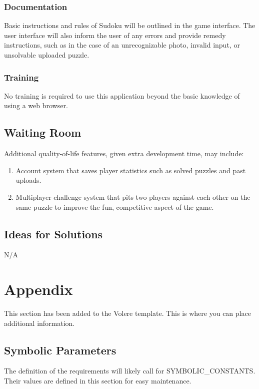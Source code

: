 \documentclass[11pt]{article}
\begin{document}
\subsubsection{Documentation}
Basic instructions and rules of Sudoku will be outlined in the game interface. The user interface will also inform the user of any errors and provide remedy instructions, such as in the case of an unrecognizable photo, invalid input, or unsolvable uploaded puzzle.

\subsubsection{Training}
No training is required to use this application beyond the basic knowledge of using a web browser.

\subsection{Waiting Room}
Additional quality-of-life features, given extra development time, may include:
\begin{enumerate}
    \item Account system that saves player statistics such as solved puzzles and past uploads.
    \item Multiplayer challenge system that pits two players against each other on the same puzzle to improve the fun, competitive aspect of the game.
\end{enumerate}


\subsection{Ideas for Solutions}
N/A





\newpage

\section{Appendix}

This section has been added to the Volere template.  This is where you can place
additional information.

\subsection{Symbolic Parameters}

The definition of the requirements will likely call for SYMBOLIC\_CONSTANTS.
Their values are defined in this section for easy maintenance.
\end{document}
